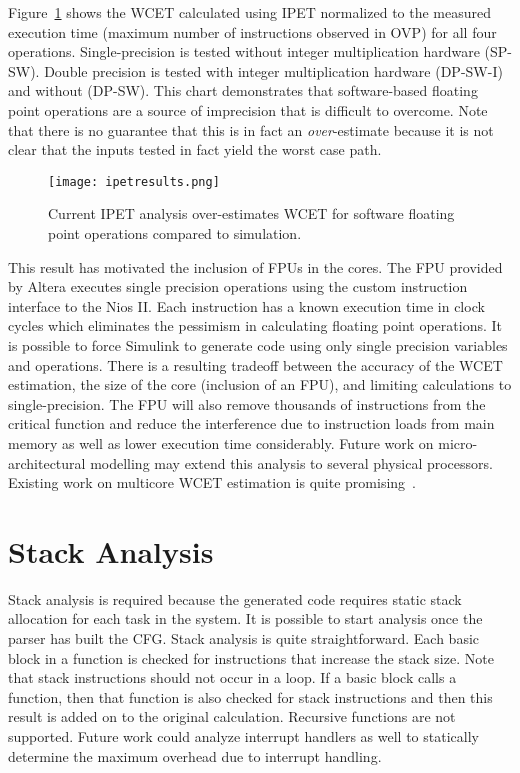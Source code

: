 Figure~\ref{f:ipetresults} shows the WCET calculated using IPET normalized to the measured execution time (maximum number of instructions observed in OVP) for all four operations. Single-precision is tested without integer multiplication hardware (SP-SW). Double precision is tested with integer multiplication hardware (DP-SW-I) and without (DP-SW). This chart demonstrates that software-based floating point operations are a source of imprecision that is difficult to overcome. Note that there is no guarantee that this is in fact an \emph{over}-estimate because it is not clear that the inputs tested in fact yield the worst case path.

\begin{figure}[h]
\centering
\texttt{[image: ipetresults.png]}
\caption[IPET results for software implemented floating point]{Current IPET analysis over-estimates WCET for software floating point operations compared to simulation.}
\label{f:ipetresults}
\end{figure}

This result has motivated the inclusion of FPUs in the cores. The FPU provided by Altera executes single precision operations using the custom instruction interface to the Nios II. Each instruction has a known execution time in clock cycles which eliminates the pessimism in calculating floating point operations. It is possible to force Simulink to generate code using only single precision variables and operations. There is a resulting tradeoff between the accuracy of the WCET estimation, the size of the core (inclusion of an FPU), and limiting calculations to single-precision. The FPU will also remove thousands of instructions from the critical function and reduce the interference due to instruction loads from main memory as well as lower execution time considerably. Future work on micro-architectural modelling may extend this analysis to several physical processors. Existing work on multicore WCET estimation is quite promising~\cite{chattopadhyay2014unified}.

\section{Stack Analysis}
	Stack analysis is required because the generated code requires static stack allocation for each task in the system. 
	It is possible to start analysis once the parser has built the CFG. 
	Stack analysis is quite straightforward. 
	Each basic block in a function is checked for instructions that increase the stack size. 
	Note that stack instructions should not occur in a loop. 
	If a basic block calls a function, then that function is also checked for stack instructions and then this result is added on to the original calculation. 
	Recursive functions are not supported. 
	Future work could analyze interrupt handlers as well to statically determine the maximum overhead due to interrupt handling.


